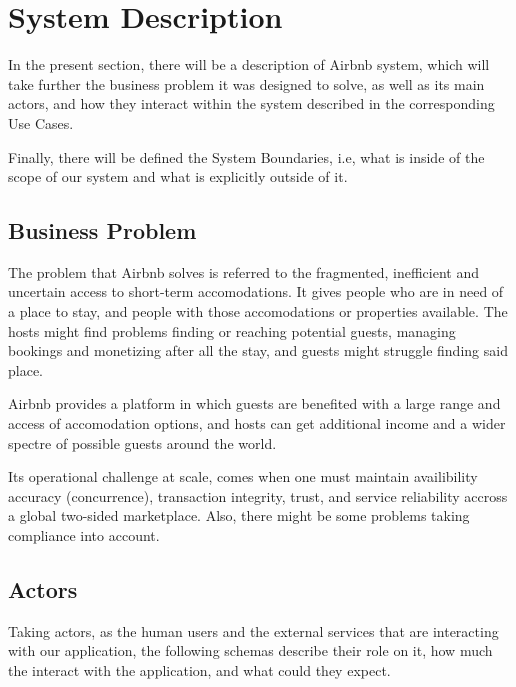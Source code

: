 \section{System Description}

In the present section, there will be a description of Airbnb system, 
which will take further the business problem it was designed to solve, as well as its 
main actors, and how they interact within the system described in the corresponding Use Cases.

Finally, there will be defined the System Boundaries, i.e, what is inside of the scope of our system
and what is explicitly outside of it.

\subsection{Business Problem}

The problem that Airbnb solves is referred to the fragmented, inefficient and uncertain access to short-term 
accomodations. It gives people who are in need of a place to stay, and people with those accomodations or 
properties available. The hosts might find problems finding or reaching potential guests, managing bookings 
and monetizing after all the stay, and guests might struggle finding said place.

Airbnb provides a platform in which guests are benefited with a large range and access of accomodation options, and hosts
can get additional income and a wider spectre of possible guests around the world.

Its operational challenge at scale, comes when one must maintain availibility accuracy (concurrence), transaction integrity,
trust, and service reliability accross a global two-sided marketplace. Also, there might be some problems taking compliance
into account.


\subsection{Actors}

Taking actors, as the human users and the external services that are interacting with our application, the following 
schemas describe their role on it, how much the interact with the application, and what could they expect.

